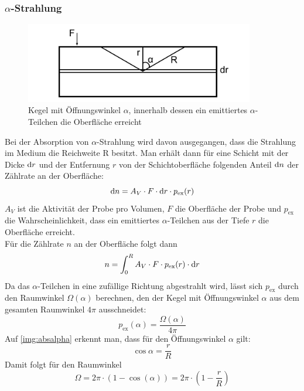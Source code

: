 \subsubsection{$\alpha$-Strahlung}
\begin{figure}[H]
\begin{center}
  \includegraphics[width=10cm]{../img/absalpha}
  \caption{Kegel mit Öffnungswinkel $\alpha$,
  innerhalb dessen ein emittiertes $\alpha$-Teilchen die Oberfläche erreicht}
  \label{img:absalpha}
\end{center}
\end{figure}
Bei der Absorption von $\alpha$-Strahlung wird davon ausgegangen, dass die Strahlung im Medium
die Reichweite R besitzt.
Man erhält dann für eine Schicht mit der Dicke $\mathrm{d} r$ und der Entfernung $r$ von der Schichtoberfläche
folgenden Anteil $\mathrm{d} n$ der Zählrate an der Oberfläche:
\begin{equation}
  \mathrm{d} n=A_V \cdot F \cdot \mathrm{d} r \cdot p_{\text{ex}}(r)
\end{equation}
$A_V$ ist die Aktivität der Probe pro Volumen, $F$ die Oberfläche der Probe und $p_{\text{ex}}$
die Wahrscheinlichkeit, dass ein emittiertes $\alpha$-Teilchen aus der Tiefe $r$ die Oberfläche erreicht.\\
Für die Zählrate $n$ an der Oberfläche folgt dann
\begin{equation}
  n=\int_{0}^{R}{A_V \cdot F \cdot p_{\text{ex}}(r) \cdot \mathrm{d} r}
\end{equation}
Da das $\alpha$-Teilchen in eine zufällige Richtung abgestrahlt wird,
lässt sich $p_{\text{ex}}$ durch den Raumwinkel $\Omega(\alpha)$ berechnen,
den der Kegel mit Öffnungswinkel $\alpha$
aus dem gesamten Raumwinkel $4\pi$ ausschneidet:
\begin{equation}
  p_{\text{ex}}(\alpha)=\frac{\Omega(\alpha)}{4\pi}
\end{equation}
Auf \autoref{img:absalpha} erkennt man,
dass für den Öffnungswinkel $\alpha$ gilt:
\begin{equation}
  \cos \alpha = \frac{r}{R}
\end{equation}
Damit folgt für den Raumwinkel
\begin{equation}
  \Omega=2\pi \cdot (1-\cos(\alpha))=2\pi \cdot (1-\frac{r}{R})
\end{equation}
